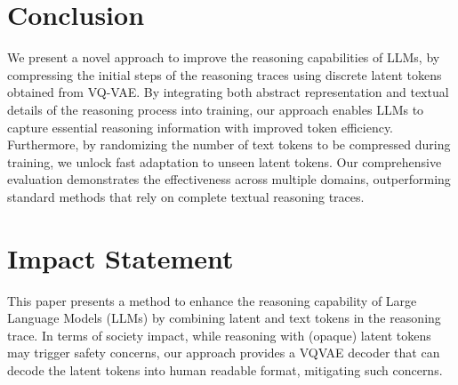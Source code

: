 \section{Conclusion}
\label{sec:conclusion}
We present a novel approach to improve the reasoning capabilities of LLMs, by compressing the initial steps of the reasoning traces using discrete latent tokens obtained from VQ-VAE. By integrating both abstract representation and textual details of the reasoning process into training, our approach enables LLMs to capture essential reasoning information with improved token efficiency. Furthermore, by randomizing the number of text tokens to be compressed during training, we unlock fast adaptation to unseen latent tokens. Our comprehensive evaluation demonstrates the effectiveness across multiple domains, outperforming standard methods that rely on complete textual reasoning traces.



\section*{Impact Statement}
This paper presents a method to enhance the reasoning capability of Large Language Models (LLMs) by combining latent and text tokens in the reasoning trace. In terms of society impact, while reasoning with (opaque) latent tokens may trigger safety concerns, our approach provides a VQVAE decoder that can decode the latent tokens into human readable format, mitigating such concerns. 